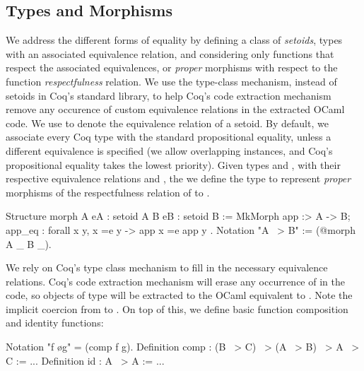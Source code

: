 \documentclass{llncs}
\begin{document}
\subsection{Types and Morphisms}
\label{sec:types-morphisms}
We address the different forms of equality by defining a class of
\emph{setoids}, types with an associated equivalence relation, and considering
only functions that respect the associated equivalences, or \emph{proper}
morphisms with respect to the function \emph{respectfulness} relation. We use
the type-class mechanism, instead of setoids in Coq's standard library, to help
Coq's code extraction mechanism remove any occurence of custom equivalence
relations in the extracted OCaml code. We use  to denote the equivalence
relation of a setoid. By default, we associate every Coq type with the standard
propositional equality, unless a different equivalence is specified (we allow
overlapping instances, and Coq's propositional equality takes the lowest
priority).
Given types  and  , with their respective
equivalence relations  and
, the we define the type
 to represent \emph{proper} morphisms of the
respectfulness relation of  to .
\begin{coqcode}
Structure morph A {eA : setoid A} B {eB : setoid B} :=
  MkMorph { app :> A -> B; app_eq : forall x y, x =e y -> app x =e app y }.
Notation "A ~> B" := (@morph A _ B _).
\end{coqcode}
We rely on Coq's type class mechanism to fill in the necessary equivalence
relations. Coq's code extraction mechanism will erase any occurrence
of  in the code, so objects of type  will be extracted to
the OCaml equivalent to . Note the implicit coercion
from  to .
On top of this, we define basic function composition and identity functions:
\begin{coqcode}
Notation "f \o g" = (comp f g).
Definition comp : (B ~> C) ~> (A ~> B) ~> A ~> C := ...
Definition id : A ~> A := ...
\end{coqcode}
\end{document}
